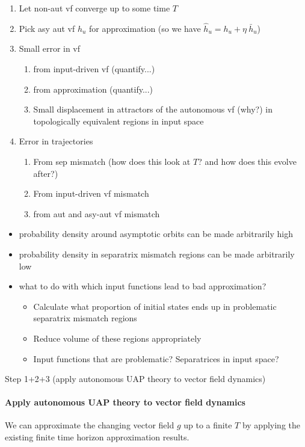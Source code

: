 \documentclass{article}
\newcounter{ct}
\begin{document}
\begin{enumerate}
\item Let non-aut vf converge up to some time $T$
\item Pick asy aut vf $h_u$ for approximation (so we have $\hat h_u = h_u + \eta\ \bar h_u$)
\item Small error in vf
\begin{enumerate}
\item from input-driven vf (quantify...)
\item from approximation (quantify...)
\item Small displacement in attractors of the autonomous vf (why?) in topologically equivalent regions in input space
\end{enumerate}
\item Error in trajectories
\begin{enumerate}
\item From sep mismatch (how does this look at $T$? and how does this evolve after?)
\item From input-driven vf mismatch
\item from aut and asy-aut vf mismatch
\end{enumerate}
\end{enumerate}

\begin{itemize}
\item probability density around asymptotic orbits can be made arbitrarily high
\item probability density in separatrix mismatch regions can be made arbitrarily low
\item what to do with which input functions lead to bad approximation?
\begin{itemize}
\item Calculate what proportion of initial states ends up in problematic separatrix mismatch regions
\item Reduce volume of these regions appropriately
\item Input functions that are problematic? Separatrices in input space?
\end{itemize}
\end{itemize}

Step 1+2+3 (apply autonomous UAP theory to vector field dynamics)
\paragraph{Apply autonomous UAP theory to vector field dynamics} %
We can approximate the changing vector field $g$ up to a finite $T$ by applying the existing finite time horizon approximation results.
\end{document}
